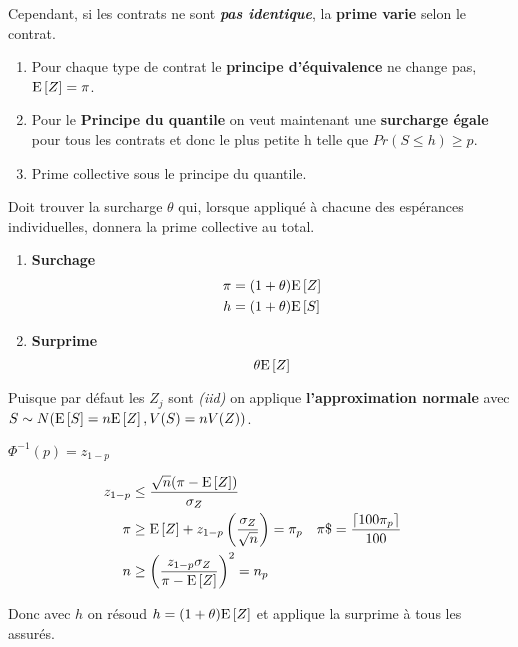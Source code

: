 \documentclass[10pt, french]{article}
\begin{document}
\begin{multicols*}{3}
Cependant, si les contrats ne sont \textbf{\textit{pas identique}}, la \textbf{prime varie }selon le contrat.
\begin{enumerate}
	\item[1. ] Pour chaque type de contrat le \textbf{principe d'équivalence} ne change pas, $\mathrm{E} \left[ Z \right] = \pi$.
	\item[3. ] Pour le \textbf{Principe du quantile }on veut maintenant une \textbf{surcharge égale} pour tous les contrats et donc le plus petite h telle que $Pr(S \le h) \ge p$.
	\item[$h$ : ] Prime collective sous le principe du quantile.
\end{enumerate}

Doit trouver la surcharge $\theta$ qui, lorsque appliqué à chacune des espérances individuelles, donnera la prime collective au total.

\begin{enumerate}
	\item[$\theta$ : ] \textbf{Surchage}
\begin{align*}
		\pi &= (1 + \theta) \mathrm{E} \left[ Z \right] \\
		h &= (1 + \theta) \mathrm{E} \left[ S \right] 
\end{align*}
	\item[] \textbf{Surprime}
	\[
		\theta \mathrm{E} \left[ Z \right]
	\]
\end{enumerate}

Puisque par défaut les $Z_{j}$ sont \textit{(iid)} on applique \textbf{l'approximation normale} avec $S \sim N(\mathrm{E} \left[ S \right] = n \mathrm{E} \left[ Z \right], V(S) = nV(Z))$.


$\Phi^{-1}(p) = z_{1 - p}$

\begin{align*}
	z_{1 - p} &\le \frac{\sqrt{n} ( \pi - \mathrm{E} \left[ Z \right])}{\sigma_{Z}}\\
	\pi &\ge \mathrm{E} \left[ Z \right] + z_{1 - p} \left(\frac{\sigma_{Z}}{\sqrt{n}}\right) = \pi_p &
	\pi\$ &= \frac{\lceil 100 \pi_p \rceil}{100} \\
	n &\ge \left(\frac{z_{1 - p}\sigma_{Z}}{\pi - \mathrm{E} \left[ Z \right]}\right)^2 = n_{p} 
\end{align*} 

Donc avec $h$ on résoud $h = (1 + \theta) \mathrm{E} \left[ Z \right]$ et applique la surprime à tous les assurés.



\end{multicols*}
\end{document}
